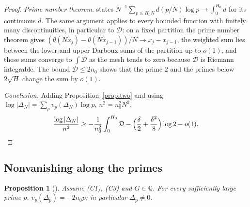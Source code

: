 \documentclass[11pt]{article}
\newtheorem{proposition}[theorem]{Proposition}
\theoremstyle{definition}
\newcommand{\Dl}{\mathcal{D}}
\begin{document}
\begin{proof}
\emph{Prime number theorem.} \cite[Eq.~(45)]{OAI} states $N^{-1}\sum_{p\le H_0N}d(p/N)\log p\to\int_0^{H_0}d$ for its continuous $d$. The same argument applies to every bounded function with finitely many discontinuities, in particular to $\Dl$: on a fixed partition the prime number theorem gives $(\theta(Nx_j)-\theta(Nx_{j-1}))/N\to x_j-x_{j-1}$, the weighted sum lies between the lower and upper Darboux sums of the partition up to $o(1)$, and these sums converge to $\int \Dl$ as the mesh tends to zero because $\Dl$ is Riemann integrable. The bound $\Dl\le2n_0$ shows that the prime $2$ and the primes below $2\sqrt H$ change the sum by $o(1)$.

\emph{Conclusion.} Adding Proposition~\ref{prop:two} and using $\log|\Delta_N|=\sum_pv_p(\Delta_N)\log p$, $n^2=n_0^2N^2$,
\[
\frac{\log|\Delta_N|}{n^2}\ge-\frac{1}{n_0^2}\int_0^{H_0}\Dl-\Big(\frac\delta2+\frac{\delta^2}8\Big)\log2-o(1).\qedhere
\]
\end{proof}

\subsection{Nonvanishing along the primes}\label{sec:nonvan}

\begin{proposition}[{\cite[Prop.~4.1]{OAI}}]\label{prop:nonzero}
Assume (C1), (C3) and $G\in\mathbb Q$. For every sufficiently large prime $p$, $v_p(\Delta_p)=-2n_0p$; in particular $\Delta_p\ne0$.
\end{proposition}
\end{document}
